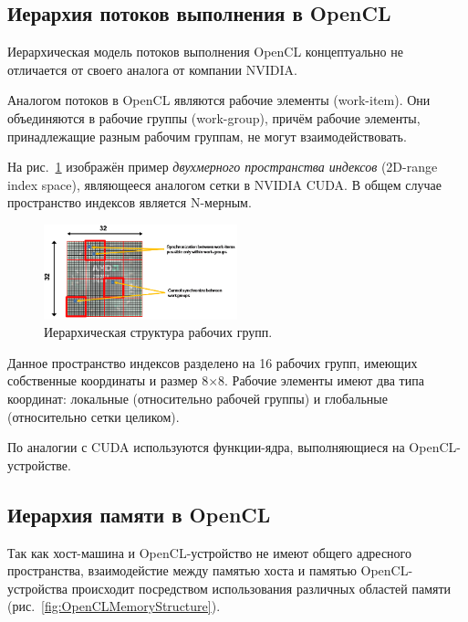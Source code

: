 \subsection{Иерархия потоков выполнения в OpenCL}

Иерархическая модель потоков выполнения OpenCL концептуально не отличается от 
своего аналога от компании NVIDIA.

Аналогом потоков в OpenCL являются рабочие элементы (work-item). Они
объединяются в рабочие группы (work-group), причём рабочие элементы, принадлежащие разным рабочим группам, не могут взаимодействовать.

На рис.~\ref{fig:WorkGroupsStructure} изображён пример \textit{двухмерного пространства индексов} (2D-range index space), являющееся аналогом сетки в NVIDIA CUDA. В общем случае пространство индексов является N-мерным.

\begin{figure}[p]
\centering
\includegraphics[width=0.5\textwidth]{include/graphics/image4}
\caption{Иерархическая структура рабочих групп.}
\label{fig:WorkGroupsStructure}
\end{figure}

Данное пространство индексов разделено на 16 рабочих групп, имеющих
собственные координаты и размер 8×8. Рабочие элементы имеют два типа координат: локальные (относительно рабочей группы) и глобальные (относительно сетки целиком).

По аналогии с CUDA используются функции-ядра, выполняющиеся на OpenCL-устройстве.

\subsection{Иерархия памяти в OpenCL}

Так как хост-машина и OpenCL-устройство не имеют общего адресного
пространства, взаимодейстие между памятью хоста и памятью OpenCL-
устройства происходит посредством использования различных областей памяти (рис.~\ref{fig:OpenCLMemoryStructure}).

